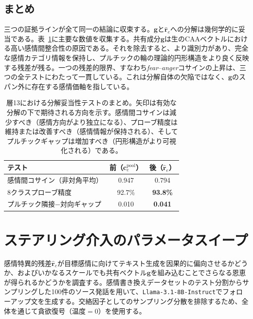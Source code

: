 \subsection{まとめ}

三つの証拠ラインが全て同一の結論に収束する。$\mathbf{g}$と$\hat{\mathbf{r}}_e$への分解は幾何学的に妥当である。表~\ref{tab:decomposition_validity_summary}に主要な数値を収集する。共有成分$\mathbf{g}$は生のCAAベクトルにおける高い感情間整合性の原因である。それを除去すると、より識別力があり、完全な感情カテゴリ情報を保持し、プルチックの輪の理論的円形構造をより良く反映する残差が残る。一つの残差的限界、すなわち\textit{fear}--\textit{anger}コサインの上昇は、三つの全テストにわたって一貫している。これは分解自体の欠陥ではなく、$\mathbf{g}$のスパン外に存在する感情価軸を指している。\par

\begin{table}[H]
\centering
\small
\begin{tabular}{lcc}
\toprule
\textbf{テスト} & \textbf{前（$\mathbf{c}^{\mathrm{pool}}_e$）} & \textbf{後（$\hat{\mathbf{r}}_e$）} \\
\midrule
感情間コサイン（非対角平均） & 0.947 & 0.794 \\
8クラスプローブ精度          & 92.7\% & \textbf{93.8\%} \\
プルチック隣接−対向ギャップ  & 0.010 & \textbf{0.041} \\
\bottomrule
\end{tabular}
\caption{層13における分解妥当性テストのまとめ。矢印は有効な分解の下で期待される方向を示す。感情間コサインは減少すべき（感情方向がより独立になる）、プローブ精度は維持または改善すべき（感情情報が保持される）、そしてプルチックギャップは増加すべき（円形構造がより可視化される）である。}
\label{tab:decomposition_validity_summary}
\end{table}

\section{ステアリング介入のパラメータスイープ}
\label{sec:steering_experiments}

感情特異的残差$\hat{\mathbf{r}}_e$が目標感情に向けてテキスト生成を因果的に偏向させるかどうか、およびいかなるスケールでも共有ベクトル$\mathbf{g}$を組み込むことでさらなる恩恵が得られるかどうかを調査する。感情書き換えデータセットのテスト分割からサンプリングした100件のソース発話を用いて、\texttt{Llama-3.1-8B-Instruct}でフォローアップ文を生成する。交絡因子としてのサンプリング分散を排除するため、全体を通じて貪欲復号（温度$= 0$）を使用する。

